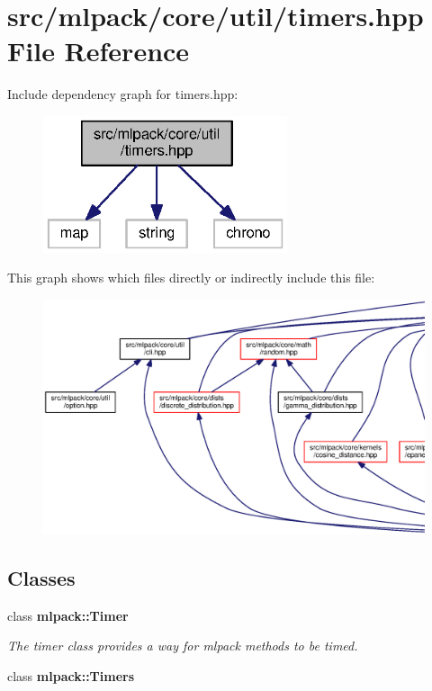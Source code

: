\section{src/mlpack/core/util/timers.hpp File Reference}
\label{timers_8hpp}
Include dependency graph for timers.\+hpp\+:
\nopagebreak
\begin{figure}[H]
\begin{center}
\leavevmode
\includegraphics[width=203pt]{timers_8hpp__incl}
\end{center}
\end{figure}
This graph shows which files directly or indirectly include this file\+:
\nopagebreak
\begin{figure}[H]
\begin{center}
\leavevmode
\includegraphics[width=350pt]{timers_8hpp__dep__incl}
\end{center}
\end{figure}
\subsection*{Classes}
\begin{DoxyCompactItemize}
\item 
class {\bf mlpack\+::\+Timer}
\begin{DoxyCompactList}\small\item\em The timer class provides a way for mlpack methods to be timed. \end{DoxyCompactList}\item 
class {\bf mlpack\+::\+Timers}
\end{DoxyCompactItemize}

